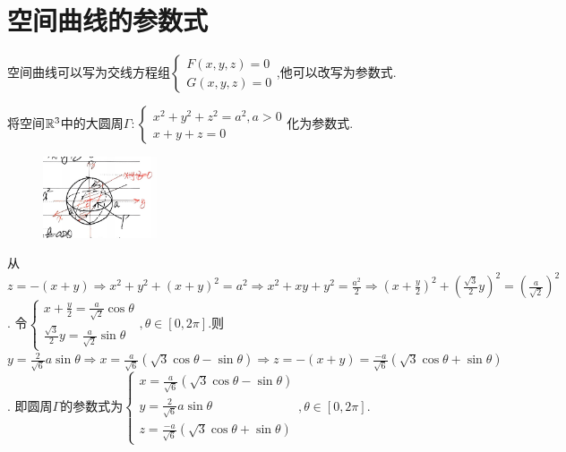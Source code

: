 \section{空间曲线的参数式}

空间曲线可以写为交线方程组$\begin{cases}
    F(x,y,z) = 0\\
    G(x,y,z) = 0
\end{cases}$,他可以改写为参数式.

\begin{example}
    将空间$\mathbb{R}^3$中的大圆周$\Gamma:\begin{cases}
        x^2+y^2+z^2 = a^2,a >0\\
        x+y+z = 0
    \end{cases}$化为参数式.
\end{example}

\begin{figure}[htbp]
    \centering
    \includegraphics[width=0.3\textwidth]{figure/5-4.png}
    \caption{}
\end{figure}

\begin{solution}
    从$z = -(x+y) \Rightarrow x^2 + y^2 + (x+y)^2 = a^2 \Rightarrow x^2 +xy +y^2 = \frac{a^2}2 \Rightarrow \left( x+ \frac{y}{2} \right)^2 + \left( \frac{\sqrt{3}}{2}y \right)^2 = \left( \frac{a}{\sqrt{2}} \right)^2$.
    令$\begin{cases}
        x + \frac{y}{2} = \frac{a}{\sqrt{2}} \cos \theta\\
        \frac{\sqrt{3}}{2}y = \frac{a}{\sqrt{2}} \sin \theta
    \end{cases}, \theta \in [0,2\pi]$.则$y = \frac{2}{\sqrt{6}} a \sin \theta \Rightarrow x = \frac{a}{\sqrt{6}} (\sqrt3 \cos \theta - \sin \theta) \Rightarrow z = -(x+y) = \frac{-a}{\sqrt 6}(\sqrt 3 \cos \theta + \sin \theta)$.
    即圆周$\Gamma$的参数式为$\begin{cases}
        x = \frac{a}{\sqrt{6}} (\sqrt 3 \cos \theta - \sin \theta)\\
        y = \frac{2}{\sqrt{6}} a \sin \theta\\
        z = \frac{-a}{\sqrt{6}} (\sqrt 3 \cos \theta + \sin \theta)
    \end{cases}, \theta \in [0,2\pi]$.

\end{solution}


